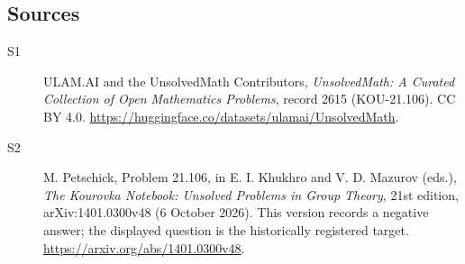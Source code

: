 \documentclass[11pt]{article}
\begin{document}
\subsection{Sources}
\begin{description}
\item[\hypertarget{source:2615:1}{S1}] ULAM.AI and the UnsolvedMath Contributors, \emph{UnsolvedMath: A Curated Collection of Open Mathematics Problems}, record 2615 (KOU-21.106). CC BY 4.0. \url{https://huggingface.co/datasets/ulamai/UnsolvedMath}.
\item[\hypertarget{source:2615:2}{S2}] M. Petschick, Problem 21.106, in E. I. Khukhro and V. D. Mazurov (eds.), \emph{The Kourovka Notebook: Unsolved Problems in Group Theory}, 21st edition, arXiv:1401.0300v48 (6 October 2026). This version records a negative answer; the displayed question is the historically registered target. \url{https://arxiv.org/abs/1401.0300v48}.
\end{description}
\label{end:2615}
\end{document}

